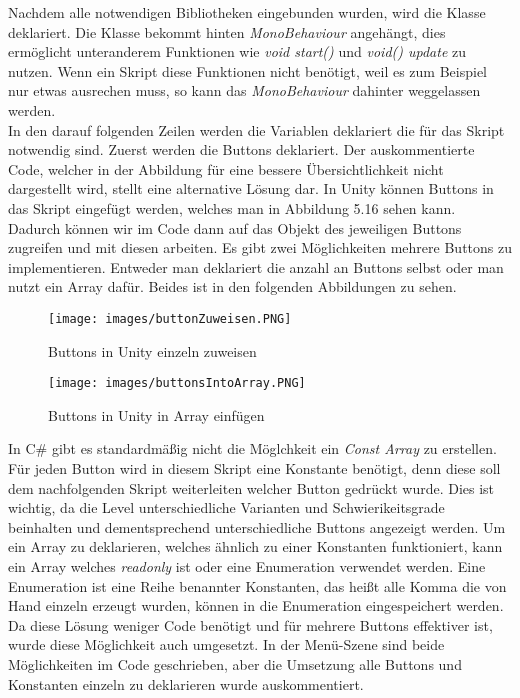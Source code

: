 Nachdem alle notwendigen Bibliotheken eingebunden wurden, wird die Klasse deklariert. Die Klasse bekommt hinten \textit{MonoBehaviour} angehängt, dies ermöglicht unteranderem Funktionen wie \textit{void start()} und \textit{void() update} zu nutzen. Wenn ein Skript diese Funktionen nicht benötigt, weil es zum Beispiel nur etwas ausrechen muss, so kann das \textit{MonoBehaviour} dahinter weggelassen werden.\\
In den darauf folgenden Zeilen werden die Variablen deklariert die für das Skript notwendig sind. Zuerst werden die Buttons deklariert. Der auskommentierte Code, welcher in der Abbildung für eine bessere Übersichtlichkeit nicht dargestellt wird, stellt eine alternative Lösung dar. In Unity können Buttons in das Skript eingefügt werden, welches man in Abbildung 5.16 sehen kann. Dadurch können wir im Code dann auf das Objekt des jeweiligen Buttons zugreifen und mit diesen arbeiten. Es gibt zwei Möglichkeiten mehrere Buttons zu implementieren. Entweder man deklariert die anzahl an Buttons selbst oder man nutzt ein Array dafür. Beides ist in den folgenden Abbildungen zu sehen.
\begin{figure}[htbp]
  \centering
  \texttt{[image: images/buttonZuweisen.PNG]}
  \caption{Buttons in Unity einzeln zuweisen}
  \label{singleButtonUnity}
\end{figure}
\begin{figure}[htbp]
  \centering
  \texttt{[image: images/buttonsIntoArray.PNG]}
  \caption{Buttons in Unity in Array einfügen}
  \label{arrayButtonUnity}
\end{figure}
In C\# gibt es standardmäßig nicht die Möglchkeit ein \textit{Const Array} zu erstellen. Für jeden Button wird in diesem Skript eine Konstante benötigt, denn diese soll dem nachfolgenden Skript weiterleiten welcher Button gedrückt wurde. Dies ist wichtig, da die Level unterschiedliche Varianten und Schwierikeitsgrade beinhalten und dementsprechend unterschiedliche Buttons angezeigt werden. Um ein Array zu deklarieren, welches ähnlich zu einer Konstanten funktioniert, kann ein Array welches \textit{readonly} ist oder eine Enumeration verwendet werden. Eine Enumeration ist eine Reihe benannter Konstanten, das heißt alle Komma die von Hand einzeln erzeugt wurden, können in die Enumeration eingespeichert werden. Da diese Lösung weniger Code benötigt und für mehrere Buttons effektiver ist, wurde diese Möglichkeit auch umgesetzt. In der Menü-Szene sind beide Möglichkeiten im Code geschrieben, aber die Umsetzung alle Buttons und Konstanten einzeln zu deklarieren wurde auskommentiert.\\
